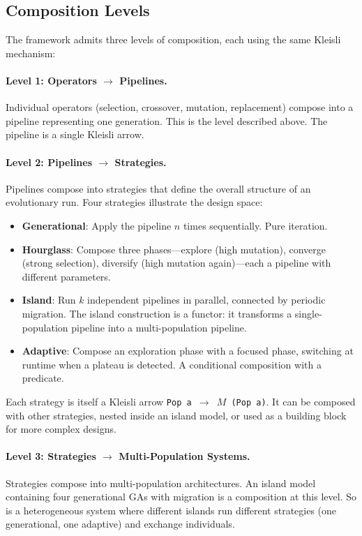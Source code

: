 \documentclass[dvipsnames,format=sigconf,anonymous=false,review=false]{acmart}
\begin{document}
\subsection{Composition Levels}

The framework admits three levels of composition, each using the same Kleisli mechanism:

\paragraph{Level 1: Operators $\to$ Pipelines.}
Individual operators (selection, crossover, mutation, replacement) compose into a pipeline representing one generation. This is the level described above. The pipeline is a single Kleisli arrow.

\paragraph{Level 2: Pipelines $\to$ Strategies.}
Pipelines compose into strategies that define the overall structure of an evolutionary run. Four strategies illustrate the design space:

\begin{itemize}[nosep]
  \item \textbf{Generational}: Apply the pipeline $n$ times sequentially. Pure iteration.
  \item \textbf{Hourglass}: Compose three phases---explore (high mutation), converge (strong selection), diversify (high mutation again)---each a pipeline with different parameters.
  \item \textbf{Island}: Run $k$ independent pipelines in parallel, connected by periodic migration. The island construction is a functor: it transforms a single-population pipeline into a multi-population pipeline.
  \item \textbf{Adaptive}: Compose an exploration phase with a focused phase, switching at runtime when a plateau is detected. A conditional composition with a predicate.
\end{itemize}

\noindent Each strategy is itself a Kleisli arrow \texttt{Pop\,a $\to$ $M$\,(Pop\,a)}. It can be composed with other strategies, nested inside an island model, or used as a building block for more complex designs.

\paragraph{Level 3: Strategies $\to$ Multi-Population Systems.}
Strategies compose into multi-population architectures. An island model containing four generational GAs with migration is a composition at this level. So is a heterogeneous system where different islands run different strategies (one generational, one adaptive) and exchange individuals.
\end{document}
